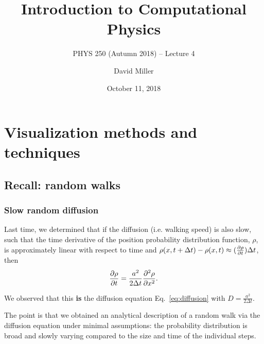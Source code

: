 \documentclass[hyperref={colorlinks=true}]{beamer}
\title[PHYS 250 (Autumn 2018) -- Lecture 4]{Introduction to Computational Physics}
\subtitle{PHYS 250 (Autumn 2018) -- Lecture 4}
\author[D.W.~Miller]{David Miller}
\institute[EFI, Chicago] 
{
  Department of Physics and the Enrico Fermi Institute\\
  University of Chicago
}
\date[October 11, 2018]{October 11, 2018}
\begin{document}

{
\begin{frame}
  \titlepage
\end{frame}
}

\section[Visualization methods and techniques]{Visualization methods and techniques}

\subsection[Recall: random walks]{Recall: random walks}

\begin{frame}%
  \frametitle{Slow random diffusion}
  
  Last time, we determined that if the diffusion (i.e. walking speed) is also slow, such that the time derivative of the position probability distribution function, $\rho$, is approximately linear with respect to time and $\rho(x, t + \Delta t) - \rho(x, t) \approx (\frac{\partial \rho}{\partial t}) \Delta t$, then
  \begin{eqnarray}
    \frac{\partial \rho}{\partial t} = \frac{a^2}{2 \Delta t} \frac{\partial^2 \rho}{\partial x^2}.
  \end{eqnarray}

  We observed that this \textbf{is} the diffusion equation Eq.~\ref{eq:diffusion} with $D=\frac{a^2}{2 \Delta t}$.
  
  \vspace{0.3cm}
  
  The point is that we obtained an analytical description of a random walk via the diffusion equation under minimal assumptions: the probability distribution is broad and slowly varying compared to the size and time of the individual steps.

\end{frame}
\end{document}
